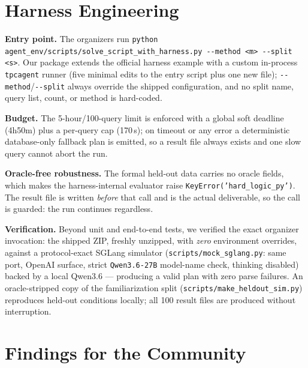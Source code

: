 \documentclass[11pt,a4paper]{article}
\begin{document}
\section{Harness Engineering}

\textbf{Entry point.} The organizers run
\lstinline|python agent_env/scripts/solve_script_with_harness.py --method <m> --split <s>|.
Our package extends the official harness example with a custom in-process
\texttt{tpcagent} runner (five minimal edits to the entry script plus one new
file); \lstinline|--method|/\lstinline|--split| always override the shipped
configuration, and no split name, query list, count, or method is hard-coded.

\textbf{Budget.} The 5-hour/100-query limit is enforced with a global soft
deadline (4h50m) plus a per-query cap (170\,s); on timeout or any error a
deterministic database-only fallback plan is emitted, so a result file always
exists and one slow query cannot abort the run.

\textbf{Oracle-free robustness.} The formal held-out data carries no oracle
fields, which makes the harness-internal evaluator raise
\texttt{KeyError('hard\_logic\_py')}. The result file is written \emph{before}
that call and is the actual deliverable, so the call is guarded: the run
continues regardless.

\textbf{Verification.} Beyond unit and end-to-end tests, we verified the
exact organizer invocation: the shipped ZIP, freshly unzipped, with
\emph{zero} environment overrides, against a protocol-exact SGLang simulator
(\texttt{scripts/mock\_sglang.py}: same port, OpenAI surface, strict
\texttt{Qwen3.6-27B} model-name check, thinking disabled) backed by a local
Qwen3.6 --- producing a valid plan with zero parse failures. An
oracle-stripped copy of the familiarization split
(\texttt{scripts/make\_heldout\_sim.py}) reproduces held-out conditions
locally; all 100 result files are produced without interruption.

\section{Findings for the Community}
\end{document}
